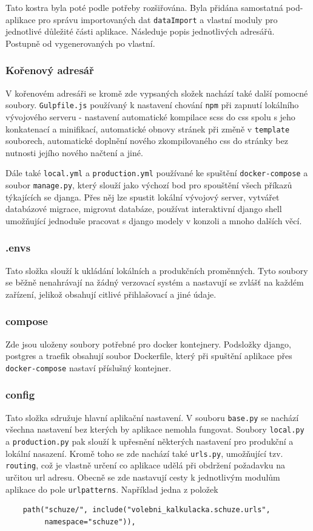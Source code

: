 \vspace{0.5cm}
Tato kostra byla poté podle potřeby rozšiřována. Byla přidána samostatná pod-aplikace pro správu importovaných dat \texttt{dataImport} a vlastní moduly pro jednotlivé důležité části aplikace. Následuje popis jednotlivých adresářů. Postupně od vygenerovaných po vlastní.

\subsubsection{Kořenový adresář}
V kořenovém adresáři se kromě zde vypsaných složek nachází také další pomocné soubory. \texttt{Gulpfile.js} používaný k nastavení chování \texttt{npm} při zapnutí lokálního vývojového serveru - nastavení automatické kompilace scss do css spolu s jeho konkatenací a minifikací, automatické obnovy stránek při změně v \texttt{template} souborech, automatické doplnění nového zkompilovaného css do stránky bez nutnosti jejího nového načtení a jiné.
\par Dále také \texttt{local.yml} a \texttt{production.yml} používané ke spuštění \texttt{docker-compose} a soubor \texttt{manage.py}, který slouží jako výchozí bod pro spouštění všech příkazů týkajících se djanga. Přes něj lze spustit lokální vývojový server, vytvářet databázové migrace, migrovat databáze, používat interaktivní django shell umožňující jednoduše pracovat s django modely v konzoli a mnoho dalších věcí. 

\subsubsection{.envs}
Tato složka slouží k ukládání lokálních a produkčních proměnných. Tyto soubory se běžně nenahrávají na žádný verzovací systém a nastavují se zvlášť na každém zařízení, jelikož obsahují citlivé přihlašovací a jiné údaje.

\subsubsection{compose}
Zde jsou uloženy soubory potřebné pro docker kontejnery. Podsložky django, postgres a traefik obsahují soubor Dockerfile, který při spuštění aplikace přes \texttt{docker-compose} nastaví příslušný kontejner.

\subsubsection{config}
Tato složka sdružuje hlavní aplikační nastavení. V souboru \texttt{base.py} se nachází všechna nastavení bez kterých by aplikace nemohla fungovat. Soubory \texttt{local.py} a \texttt{production.py} pak slouží k upřesnění některých nastavení pro produkční a lokální nasazení. Kromě toho se zde nachází také \texttt{urls.py}, umožňující tzv. \texttt{routing}, což je vlastně určení co aplikace udělá při obdržení požadavku na určitou url adresu. Obecně se zde nastavují cesty k jednotlivým modulům aplikace do pole \texttt{urlpatterns}. Například jedna z položek
\begin{verbatim}
    path("schuze/", include("volebni_kalkulacka.schuze.urls", 
         namespace="schuze")),
\end{verbatim}

